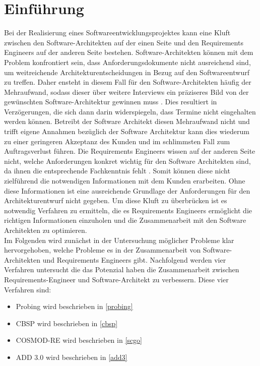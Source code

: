 \section{Einf\"uhrung}
Bei der Realisierung eines Softwareentwicklungsprojektes kann eine Kluft zwischen den Software-Architekten auf der einen Seite und den Requirements Engineers auf der anderen Seite bestehen. Software-Architekten k\"onnen mit dem Problem konfrontiert sein, dass Anforderungsdokumente nicht ausreichend sind, um weitreichende Architekturentscheidungen in Bezug auf den Softwareentwurf zu treffen. Daher ensteht in diesem Fall f\"ur den Software-Architekten h\"aufig der Mehraufwand, sodass dieser \"uber weitere Interviews ein pr\"aziseres Bild von der gew\"unschten Software-Architektur gewinnen muss \cite{Ros01}. Dies resultiert in Verz\"ogerungen, die sich dann darin widerspiegeln, dass Termine nicht eingehalten werden k\"onnen. Betreibt der Software Architekt diesen Mehraufwand nicht und trifft eigene Annahmen bez\"uglich der Software Architektur \cite{Ros01} kann dies wiederum zu einer geringeren Akzeptanz des Kunden und im schlimmsten Fall zum Auftragsverlust f\"uhren. Die Requirements Engineers wissen auf der anderen Seite nicht, welche Anforderungen konkret wichtig f\"ur den Software Architekten sind, da ihnen die entsprechende Fachkenntnis fehlt \cite{Ros01}. Somit k\"onnen diese nicht zielf\"uhrend die notwendigen Informationen mit dem Kunden erarbeiten. Ohne diese Informationen ist eine ausreichende Grundlage der Anforderungen f\"ur den Architekturentwurf nicht gegeben. Um diese Kluft zu \"uberbr\"ucken ist es notwendig Verfahren zu ermitteln, die es Requirements Engineers erm\"oglicht die richtigen Informationen einzuholen und die Zusammenarbeit mit den Software Architekten zu optimieren.\\

Im Folgenden wird zun\"achst in der Untersuchung m\"oglicher Probleme klar hervorgehoben, welche Probleme es in der Zusammenarbeit von Software-Architekten und Requirements Engineers gibt. Nachfolgend werden vier Verfahren untersucht die das Potenzial haben die Zusammenarbeit zwischen Requirements-Engineer und Software-Architekt zu verbessern. Diese vier Verfahren sind:\\

\begin{itemize}
\item Probing wird beschrieben in \ref{probing}
\item CBSP wird beschrieben in \ref{cbsp}
\item COSMOD-RE wird beschrieben in \ref{scgo}
\item ADD 3.0 wird beschrieben in \ref{add3}\\
\end{itemize}

